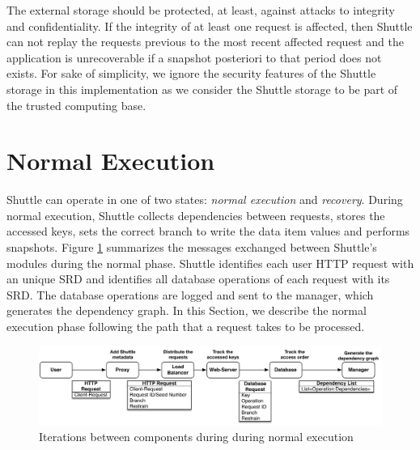 The external storage should be protected, at least, against attacks to integrity and confidentiality. If the integrity of at least one request is affected, then Shuttle can not replay the requests previous to the most recent affected request and the application is unrecoverable if a snapshot posteriori to that period does not exists. For sake of simplicity, we ignore the security features of the Shuttle storage in this implementation as we consider the Shuttle storage to be part of the trusted computing base.








\section{Normal Execution}\label{sec:impl:normal}

Shuttle can operate in one of two states: \textit{normal execution} and \textit{recovery}. During normal execution, Shuttle collects  dependencies between requests, stores the accessed keys, sets the correct branch to write the data item values and performs snapshots. Figure \ref{fig:normal:mensaging} summarizes the messages exchanged between Shuttle's modules during the normal phase. Shuttle identifies each user \ac{HTTP} request with an unique \acf{SRD} and identifies all database operations of each request with its \ac{SRD}. The database operations are logged and sent to the manager, which generates the dependency graph. 
In this Section, we describe the normal execution phase following the path that a request takes to be processed.

\begin{figure}
  \centering
  \includegraphics[width=\textwidth]{images/message_normal}
  \caption{Iterations between components during during normal execution}
  \label{fig:normal:mensaging}
\end{figure}



